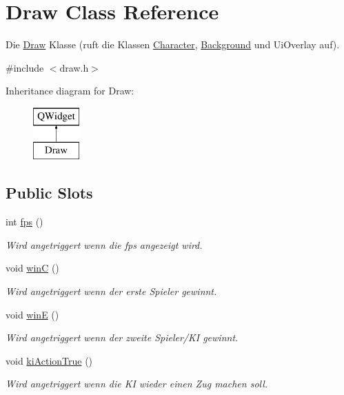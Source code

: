 \hypertarget{class_draw}{}\section{Draw Class Reference}
\label{class_draw}


Die \hyperlink{class_draw}{Draw} Klasse (ruft die Klassen \hyperlink{class_character}{Character}, \hyperlink{class_background}{Background} und Ui\+Overlay auf).  




{\ttfamily \#include $<$draw.\+h$>$}

Inheritance diagram for Draw\+:\begin{figure}[H]
\begin{center}
\leavevmode
\includegraphics[height=2.000000cm]{class_draw}
\end{center}
\end{figure}
\subsection*{Public Slots}
\begin{DoxyCompactItemize}
\item 
\hypertarget{class_draw_a4e01f0c9c841a83b86cee5f35b4041a2}{}int \hyperlink{class_draw_a4e01f0c9c841a83b86cee5f35b4041a2}{fps} ()\label{class_draw_a4e01f0c9c841a83b86cee5f35b4041a2}

\begin{DoxyCompactList}\small\item\em Wird angetriggert wenn die fps angezeigt wird. \end{DoxyCompactList}\item 
\hypertarget{class_draw_a706414ad08bb093ccd2bcd61e12dabe1}{}void \hyperlink{class_draw_a706414ad08bb093ccd2bcd61e12dabe1}{win\+C} ()\label{class_draw_a706414ad08bb093ccd2bcd61e12dabe1}

\begin{DoxyCompactList}\small\item\em Wird angetriggert wenn der erste Spieler gewinnt. \end{DoxyCompactList}\item 
\hypertarget{class_draw_ac63e4e142c5a594016d51a80f7de5194}{}void \hyperlink{class_draw_ac63e4e142c5a594016d51a80f7de5194}{win\+E} ()\label{class_draw_ac63e4e142c5a594016d51a80f7de5194}

\begin{DoxyCompactList}\small\item\em Wird angetriggert wenn der zweite Spieler/\+K\+I gewinnt. \end{DoxyCompactList}\item 
void \hyperlink{class_draw_a16841fa2b2ccda01f1e90d657d4427bc}{ki\+Action\+True} ()
\begin{DoxyCompactList}\small\item\em Wird angetriggert wenn die K\+I wieder einen Zug machen soll. \end{DoxyCompactList}\end{DoxyCompactItemize}
